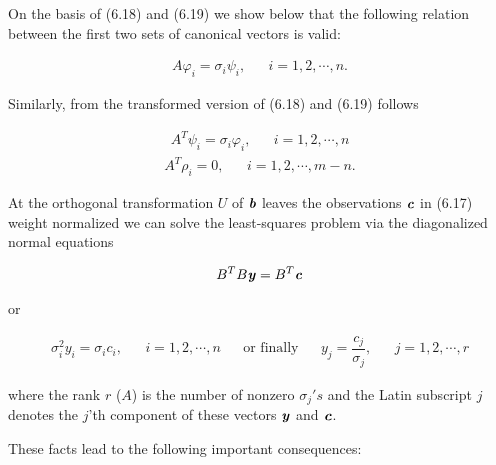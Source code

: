 On the basis of (6.18) and (6.19) we show below that the following relation between the first two sets of canonical vectors is valid:

\begin{align}
A\varphi_{i}=\sigma_{i}\psi_{i}, & &  i=1,2,\cdots,n.
\end{align}
\begin{flushleft}
	Similarly, from the transformed version of (6.18) and (6.19) follows
\end{flushleft}
\begin{align}
A^{T}\psi_{i}=\sigma_{i}\varphi_{i}, & &  i=1,2,\cdots,n
\end{align}
\begin{align}
A^{T}\rho_{i}=0, & &  i=1,2,\cdots,m-n.
\end{align}
\begin{flushleft}
	At the orthogonal transformation $U$ of $\textbf{\textit{b}}$ leaves the observations $\textbf{\textit{c}}$ in (6.17) weight normalized we can solve the least-squares  problem via the diagonalized normal equations
\end{flushleft}
\begin{align}
B^{T}B\textbf{\textit{y}}=B^{T}\textbf{\textit{c}}
\end{align}
\begin{flushleft}
	or
\end{flushleft}

\begin{align*}
\sigma^{2}_{i}y_{i}=\sigma_{i}c_{i}, & & i=1,2,\cdots,n  &  & \text{or finally}&  & y_{j}=\dfrac{c_{j}}{\sigma_{j}},& & j=1,2,\cdots,r
\end{align*}
\begin{flushleft}
	where the rank $r$ ($A$) is the number of nonzero $ \sigma_{j}'s $ and the Latin subscript $j$ denotes the $ j$'th  component of these vectors $\textbf{\textit{y}}$ and $\textbf{\textit{c}}$.
\end{flushleft}

These facts lead to the following important consequences:

